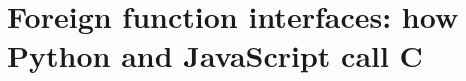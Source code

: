 \chapter{Foreign function interfaces: how Python and JavaScript call C}
\label{ch:foreign-function-interfaces-how-python}

